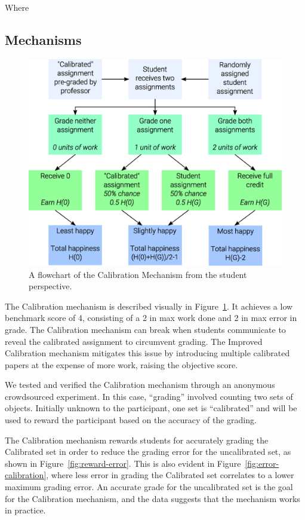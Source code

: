 \documentclass{sigchi}
\begin{document}
Where 
\subsection{Mechanisms}

\begin{figure}[!h]
\centering
\includegraphics[width=0.9\columnwidth]{Calibration-Flowchart.eps}
\caption{A flowchart of the Calibration Mechanism from the student perspective.}
\label{fig:calibration}
\end{figure}

The Calibration mechanism is described visually in Figure~\ref{fig:calibration}. It achieves a low benchmark score of 4, consisting of a 2 in max work done and 2 in max error in grade.
The Calibration mechanism can break when students communicate to reveal the calibrated assignment to circumvent grading. The Improved Calibration mechanism mitigates this issue by introducing multiple calibrated papers at the expense of more work, raising the objective score.

We tested and verified the Calibration mechanism through an anonymous crowdsourced experiment. In this case, ``grading'' involved counting two sets of objects. Initially unknown to the participant, one set is ``calibrated'' and will be used to reward the participant based on the accuracy of the grading.

The Calibration mechanism rewards students for accurately grading the Calibrated set in order to reduce the grading error for the uncalibrated set, as shown in Figure~\ref{fig:reward-error}. This is also evident in Figure~\ref{fig:error-calibration}, where less error in grading the Calibrated set correlates to a lower maximum grading error. An accurate grade for the uncalibrated set is the goal for the Calibration mechanism, and the data suggests that the mechanism works in practice.
\end{document}
